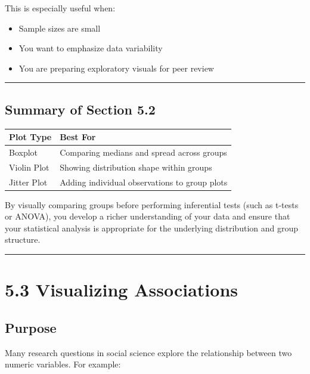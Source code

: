 \documentclass[
]{book}
\providecommand{\tightlist}{%
  \setlength{\itemsep}{0pt}\setlength{\parskip}{0pt}}
\begin{document}
This is especially useful when:

\begin{itemize}
\tightlist
\item
  Sample sizes are small
\item
  You want to emphasize data variability
\item
  You are preparing exploratory visuals for peer review
\end{itemize}

\begin{center}\rule{0.5\linewidth}{0.5pt}\end{center}

\subsection{Summary of Section 5.2}\label{summary-of-section-5.2}

\begin{longtable}[]{@{}ll@{}}
\toprule\noalign{}
Plot Type & Best For \\
\midrule\noalign{}
\endhead
\bottomrule\noalign{}
\endlastfoot
Boxplot & Comparing medians and spread across groups \\
Violin Plot & Showing distribution shape within groups \\
Jitter Plot & Adding individual observations to group plots \\
\end{longtable}

By visually comparing groups before performing inferential tests (such as t-tests or ANOVA), you develop a richer understanding of your data and ensure that your statistical analysis is appropriate for the underlying distribution and group structure.

\begin{center}\rule{0.5\linewidth}{0.5pt}\end{center}

\section{5.3 Visualizing Associations}\label{visualizing-associations}

\subsection{Purpose}\label{purpose-2}

Many research questions in social science explore the relationship between two numeric variables. For example:
\end{document}
